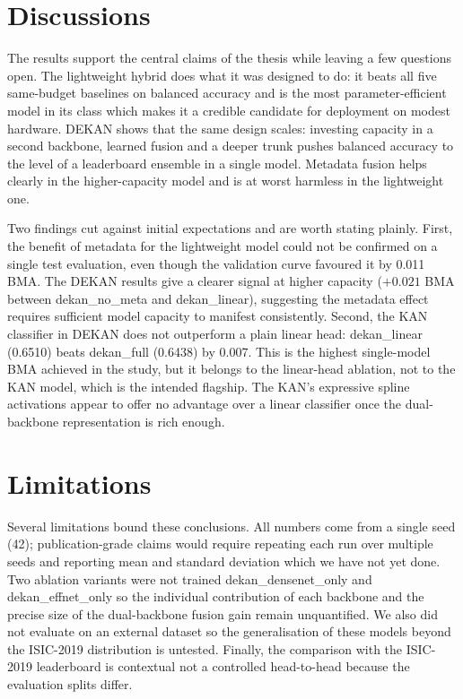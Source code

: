 \section{Discussions}

The results support the central claims of the thesis while leaving a few
questions open. The lightweight hybrid does what it was designed to do: it beats
all five same-budget baselines on balanced accuracy and is the most
parameter-efficient model in its class which makes it a credible candidate for
deployment on modest hardware. DEKAN shows that the same design scales: investing
capacity in a second backbone, learned fusion and a deeper trunk pushes balanced
accuracy to the level of a leaderboard ensemble in a single model. Metadata
fusion helps clearly in the higher-capacity model and is at worst harmless in
the lightweight one.

Two findings cut against initial expectations and are worth stating plainly.
First, the benefit of metadata for the lightweight model could not be confirmed
on a single test evaluation, even though the validation curve favoured it by
0.011 BMA. The DEKAN results give a clearer signal at higher capacity
($+0.021$ BMA between dekan\_no\_meta and dekan\_linear), suggesting the
metadata effect requires sufficient model capacity to manifest consistently.
Second, the KAN classifier in DEKAN does not outperform a plain linear head:
dekan\_linear (0.6510) beats dekan\_full (0.6438) by 0.007. This is the
highest single-model BMA achieved in the study, but it belongs to the
linear-head ablation, not to the KAN model, which is the intended flagship.
The KAN's expressive spline activations appear to offer no advantage over a
linear classifier once the dual-backbone representation is rich enough.

\section{Limitations}

Several limitations bound these conclusions. All numbers come from a single seed
(42); publication-grade claims would require repeating each run over multiple
seeds and reporting mean and standard deviation which we have not yet done.
Two ablation variants were not trained dekan\_densenet\_only and
dekan\_effnet\_only so the individual contribution of each backbone and the
precise size of the dual-backbone fusion gain remain unquantified. We also did
not evaluate on an external dataset so the generalisation of these models beyond
the ISIC-2019 distribution is untested. Finally, the comparison with the
ISIC-2019 leaderboard is contextual not a controlled head-to-head because the
evaluation splits differ.
